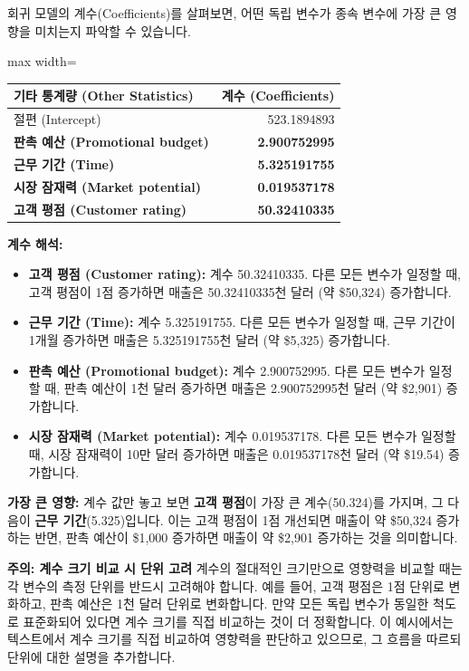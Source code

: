 \documentclass[11pt,a4paper]{article}
\begin{document}
\newpage
\begin{tcolorbox}[title=\textbf{가장 영향력 있는 변수 식별 (Most Impactful Variables)}]
회귀 모델의 계수(Coefficients)를 살펴보면, 어떤 독립 변수가 종속 변수에 가장 큰 영향을 미치는지 파악할 수 있습니다.

\begin{adjustbox}{max width=\textwidth}
\begin{tabular}{l r}
\toprule
\textbf{기타 통계량 (Other Statistics)} & \textbf{계수 (Coefficients)} \\
\midrule
절편 (Intercept) & 523.1894893 \\
\textbf{판촉 예산 (Promotional budget)} & \textbf{2.900752995} \\
\textbf{근무 기간 (Time)} & \textbf{5.325191755} \\
\textbf{시장 잠재력 (Market potential)} & \textbf{0.019537178} \\
\textbf{고객 평점 (Customer rating)} & \textbf{50.32410335} \\
\bottomrule
\end{tabular}
\end{adjustbox}

\textbf{계수 해석:}
\begin{itemize}
    \item \textbf{고객 평점 (Customer rating):} 계수 50.32410335. 다른 모든 변수가 일정할 때, 고객 평점이 1점 증가하면 매출은 50.32410335천 달러 (약 \$50,324) 증가합니다.
    \item \textbf{근무 기간 (Time):} 계수 5.325191755. 다른 모든 변수가 일정할 때, 근무 기간이 1개월 증가하면 매출은 5.325191755천 달러 (약 \$5,325) 증가합니다.
    \item \textbf{판촉 예산 (Promotional budget):} 계수 2.900752995. 다른 모든 변수가 일정할 때, 판촉 예산이 1천 달러 증가하면 매출은 2.900752995천 달러 (약 \$2,901) 증가합니다.
    \item \textbf{시장 잠재력 (Market potential):} 계수 0.019537178. 다른 모든 변수가 일정할 때, 시장 잠재력이 10만 달러 증가하면 매출은 0.019537178천 달러 (약 \$19.54) 증가합니다.
\end{itemize}

\textbf{가장 큰 영향:}
계수 값만 놓고 보면 \textbf{고객 평점}이 가장 큰 계수(50.324)를 가지며, 그 다음이 \textbf{근무 기간}(5.325)입니다. 이는 고객 평점이 1점 개선되면 매출이 약 \$50,324 증가하는 반면, 판촉 예산이 \$1,000 증가하면 매출이 약 \$2,901 증가하는 것을 의미합니다.

\begin{cautionbox}
\textbf{주의: 계수 크기 비교 시 단위 고려}
계수의 절대적인 크기만으로 영향력을 비교할 때는 각 변수의 측정 단위를 반드시 고려해야 합니다. 예를 들어, 고객 평점은 1점 단위로 변화하고, 판촉 예산은 1천 달러 단위로 변화합니다. 만약 모든 독립 변수가 동일한 척도로 표준화되어 있다면 계수 크기를 직접 비교하는 것이 더 정확합니다. 이 예시에서는 텍스트에서 계수 크기를 직접 비교하여 영향력을 판단하고 있으므로, 그 흐름을 따르되 단위에 대한 설명을 추가합니다.
\end{cautionbox}


\end{tcolorbox}
\end{document}
